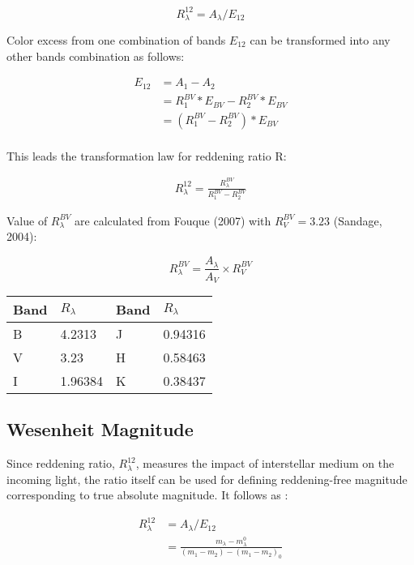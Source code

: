 \documentclass[12pt,a4paper]{article}
\begin{document}
$$R_\lambda^{12} = A_\lambda/E_{12}$$

Color excess from one combination of bands $E_{12}$ can be transformed into any other bands combination as follows:

\begin{align*}
E_{12} & = A_{1} - A_{2} \\
    & = R_{1}^{BV} * E_{BV} - R_{2}^{BV} * E_{BV} \\
    & = (R_{1}^{BV} - R_{2}^{BV})*E_{BV} \\
\end{align*}


This leads the transformation law for reddening ratio R:

\begin{align*}
    R_\lambda^{12} = \frac{R_\lambda^{BV}}{R_1^{BV} - R_2^{BV}}
\end{align*}

Value of $R_\lambda^{BV}$ are calculated from Fouque (2007) with $R_V^{BV} = 3.23$ (Sandage, 2004):

$$R_\lambda^{BV} = \frac{A_\lambda}{A_V} \times R_V^{BV} $$

\begin{table}[h]
    \centering
    \small
    \renewcommand{\arraystretch}{1.5}
    \begin{tabular}{ll|ll}
    \hline
    Band & $R_\lambda$ & Band & $R_\lambda$ \\ \hline  
    B & 4.2313 & J & 0.94316 \\ 
    V & 3.23 & H & 0.58463 \\ 
    I & 1.96384 & K & 0.38437 \\ \hline
    \end{tabular}
    \label{tab:R_values}
    \end{table}


\subsection{Wesenheit Magnitude}

Since reddening ratio, $R_\lambda^{12}$, measures the impact of interstellar medium on the incoming light, the ratio itself can be used for defining reddening-free magnitude corresponding to true absolute magnitude. It follows as :

\begin{align*}
R_\lambda^{12} & = A_\lambda / E_{12} \\
    & = \frac{m_\lambda - m_\lambda^0}{(m_1 - m_2)-(m_1 - m_2)_0} \\
\end{align*}
\end{document}
